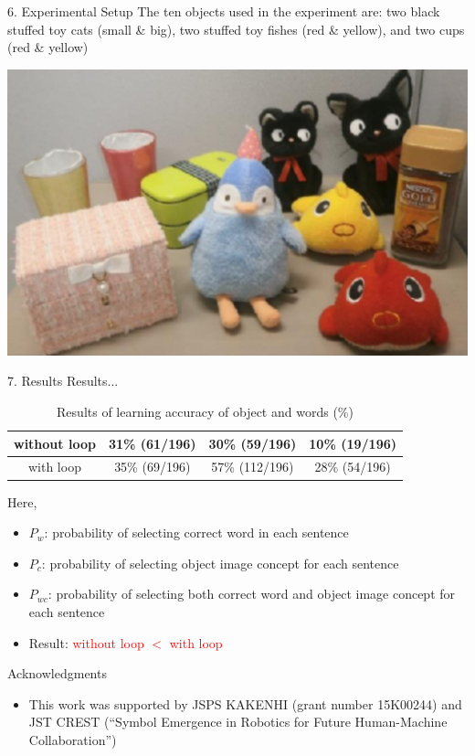 \documentclass[final,hyperref={pdfpagelabels=false}]{beamer}
\begin{document}
\begin{frame}[t]
\begin{columns}[t]
\begin{column}{.43\textwidth}
    \begin{block}{6. Experimental Setup}
The ten objects used in the experiment are: two black stuffed toy cats (small \& big), two stuffed toy fishes (red \& yellow), and two cups (red \& yellow)\\
      \begin{center}
        \includegraphics[width=0.4\columnwidth]{./fig/ten_objects.pdf}
      \end{center}
    \end{block}

    \begin{block}{7. Results}
      Results... \\
    \begin{table}
       \caption{Results of learning accuracy of object and words (\%)}
        \label{tab:result}
        \begin{tabular}{|c||c|c|c|}
        \hline
           without loop & 31\% (61/196) & 30\% (59/196) &  10\% (19/196) \\
        \hline
           with loop & 35\% (69/196) & 57\% (112/196) & 28\% (54/196) \\
        \hline
        \end{tabular}
    \end{table}
    Here, 
    \begin{itemize}
        \item $P_{w}$: probability of selecting correct word in each sentence
        \item $P_{c}$: probability of selecting object image concept for each sentence
        \item $P_{wc}$: probability of selecting both correct word and object image concept for each sentence
        \item Result: \textcolor{red}{without loop $<$ with loop}
    \end{itemize}
    \end{block}

    \begin{block}{Acknowledgments}
    \begin{itemize}
    \item This work was supported by JSPS KAKENHI (grant number 15K00244) and
JST CREST (“Symbol Emergence in Robotics for Future Human-Machine
Collaboration”)
    \end{itemize}
    \end{block}


\end{column}
\end{columns}
\end{frame}
\end{document}
